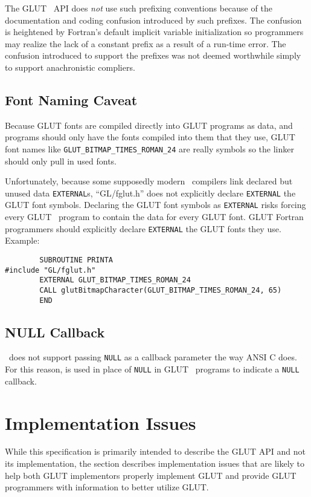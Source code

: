 \documentclass[titlepage,twoside]{article}
\begin{document}
The GLUT \Fortran\ API does {\em not} use such prefixing conventions
because of the documentation and coding confusion introduced by
such prefixes.  The confusion is heightened by
{\sc Fortran}'s default implicit variable initialization so programmers
may realize the lack of a constant prefix as a result of a run-time error.
The confusion introduced to support the prefixes
was not deemed worthwhile simply to support anachronistic
compliers.

\subsection{Font Naming Caveat}

Because GLUT fonts are compiled directly into GLUT programs as data,
and programs should only have the fonts compiled into them that they use,
GLUT font names like {\tt GLUT\_BITMAP\_TIMES\_ROMAN\_24} are really
symbols so the linker should only pull in used fonts.

Unfortunately, because some supposedly modern \Fortran\ compilers
link declared but unused data {\tt EXTERNAL}s, ``GL/fglut.h'' does not
explicitly declare {\tt EXTERNAL} the GLUT font symbols.  Declaring the
GLUT font symbols as 
{\tt EXTERNAL} risks forcing every GLUT \Fortran\
program to contain the data for every GLUT font.  GLUT
Fortran programmers should explicitly declare {\tt EXTERNAL}
the GLUT fonts they use.  Example:
\begin{verbatim}
        SUBROUTINE PRINTA
#include "GL/fglut.h"
        EXTERNAL GLUT_BITMAP_TIMES_ROMAN_24
        CALL glutBitmapCharacter(GLUT_BITMAP_TIMES_ROMAN_24, 65)
        END
\end{verbatim}

\subsection{NULL Callback}

\Fortran\ does not support passing {\tt NULL} as a callback
parameter the way ANSI C does.  For this reason, 
is used in place of {\tt NULL} in GLUT \Fortran\ programs to
indicate a {\tt NULL} callback.

\section{Implementation Issues}

While this specification is primarily intended to describe the GLUT API
and not its implementation, the section describes implementation
issues that are likely to help both GLUT implementors properly
implement GLUT and provide GLUT programmers with information to better
utilize GLUT.
\end{document}
